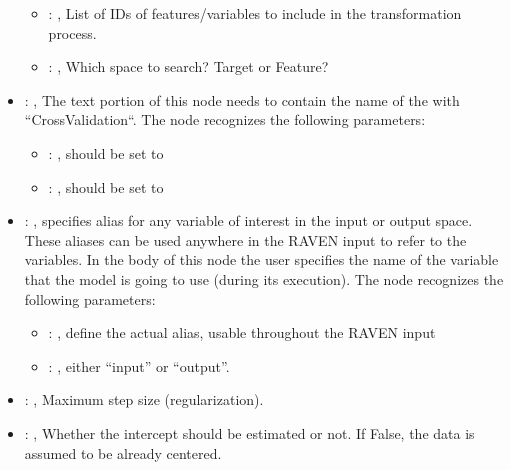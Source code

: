 \begin{itemize}
\begin{itemize}
        \item {}: , 
          List of IDs of features/variables to include in the transformation process.

        \item {}: , 
          Which space to search? Target or Feature?
      \end{itemize}

    \item {}: , 
      The text portion of this node needs to contain the name of the  with
               ``CrossValidation``.
      The  node recognizes the following parameters:
        \begin{itemize}
          \item {}: , 
            should be set to 
          \item {}: , 
            should be set to 
      \end{itemize}

    \item {}: , 
      specifies alias for         any variable of interest in the input or output space. These
      aliases can be used anywhere in the RAVEN input to         refer to the variables. In the body
      of this node the user specifies the name of the variable that the model is going to use
      (during its execution).
      The  node recognizes the following parameters:
        \begin{itemize}
          \item {}: , 
            define the actual alias, usable throughout the RAVEN input
          \item {}: , 
            either ``input'' or ``output''.
      \end{itemize}

    \item {}: , 
      Maximum step size (regularization).

    \item {}: , 
      Whether the intercept should be estimated or not. If False,
      the data is assumed to be already centered.


\end{itemize}
